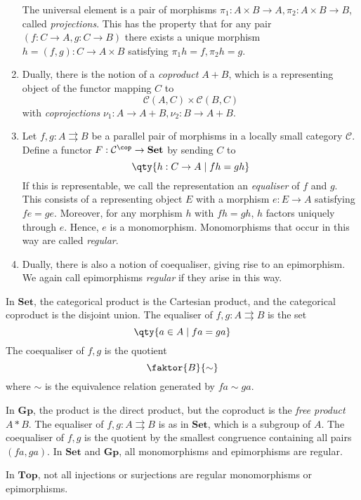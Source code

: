 \begin{enumerate}
    The universal element is a pair of morphisms \( \pi_1 : A \times B \to A, \pi_2 : A \times B \to B \), called \emph{projections}.
    This has the property that for any pair \( (f : C \to A, g : C \to B) \) there exists a unique morphism \( h = (f, g) : C \to A \times B \) satisfying \( \pi_1 h = f, \pi_2 h = g \).
    \item Dually, there is the notion of a \emph{coproduct} \( A + B \), which is a representing object of the functor mapping \( C \) to
    \[ \mathcal C(A, C) \times \mathcal C(B, C) \]
    with \emph{coprojections} \( \nu_1 : A \to A + B, \nu_2 : B \to A + B \).
    \item Let \( f, g : A \rightrightarrows B \) be a parallel pair of morphisms in a locally small category \( \mathcal C \).
    Define a functor \( F : \mathcal C^\cop \to \mathbf{Set} \) by sending \( C \) to
    \[ \qty{h : C \to A \mid fh = gh} \]
    If this is representable, we call the representation an \emph{equaliser} of \( f \) and \( g \).
    This consists of a representing object \( E \) with a morphism \( e : E \to A \) satisfying \( fe = ge \).
    Moreover, for any morphism \( h \) with \( fh = gh \), \( h \) factors uniquely through \( e \).
    Hence, \( e \) is a monomorphism.
    Monomorphisms that occur in this way are called \emph{regular}.
    \item Dually, there is also a notion of coequaliser, giving rise to an epimorphism.
    We again call epimorphisms \emph{regular} if they arise in this way.
\end{enumerate}
In \( \mathbf{Set} \), the categorical product is the Cartesian product, and the categorical coproduct is the disjoint union.
The equaliser of \( f, g : A \rightrightarrows B \) is the set
\[ \qty{a \in A \mid fa = ga} \]
The coequaliser of \( f, g \) is the quotient
\[ \faktor{B}{\sim} \]
where \( \sim \) is the equivalence relation generated by \( fa \sim ga \).

In \( \mathbf{Gp} \), the product is the direct product, but the coproduct is the \emph{free product} \( A \ast B \).
The equaliser of \( f, g : A \rightrightarrows B \) is as in \( \mathbf{Set} \), which is a subgroup of \( A \).
The coequaliser of \( f, g \) is the quotient by the smallest congruence containing all pairs \( (fa, ga) \).
In \( \mathbf{Set} \) and \( \mathbf{Gp} \), all monomorphisms and epimorphisms are regular.

In \( \mathbf{Top} \), not all injections or surjections are regular monomorphisms or epimorphisms.


